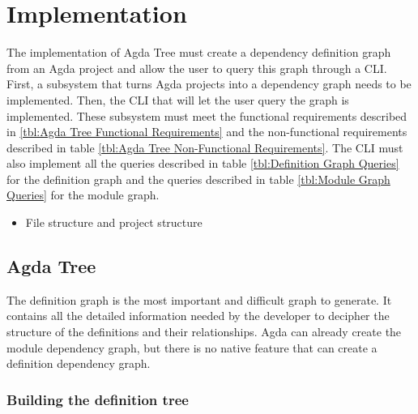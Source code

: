 
\chapter{Implementation} \label{ch:implementation}

The implementation of Agda Tree must create a dependency definition graph from
an Agda project and allow the user to query this graph through a CLI. First, a
subsystem that turns Agda projects into a dependency graph needs to be
implemented. Then, the CLI that will let the user query the graph is
implemented. These subsystem must meet the functional requirements described in
\ref{tbl:Agda Tree Functional Requirements} and the non-functional requirements
described in table \ref{tbl:Agda Tree Non-Functional Requirements}. The CLI
must also implement all the queries described in table \ref{tbl:Definition Graph Queries} 
for the definition graph and the queries described in table
\ref{tbl:Module Graph Queries} for the module graph.


\begin{itemize}
\item File structure and project structure
\end{itemize}

\section{Agda Tree}

The definition graph is the most important and difficult graph to generate. It
contains all the detailed information needed by the developer to decipher the
structure of the definitions and their relationships. Agda can already create
the module dependency graph, but there is no native feature that can create a
definition dependency graph. 

\subsection{Building the definition tree}


